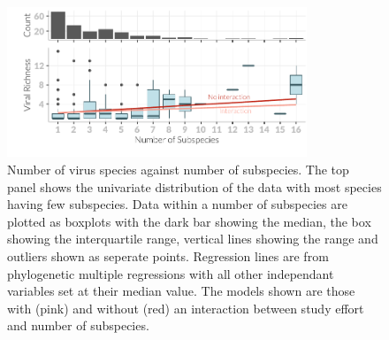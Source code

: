 \begin{knitrout}\footnotesize
{}\color{fgcolor}\begin{figure}[t]

{\centering \includegraphics[width=0.8\textwidth]{figure/boxplot-1} 

}

\caption[Number of virus species against number of subspecies]{Number of virus species against number of subspecies. 		
The top panel shows the univariate distribution of the data with most species having few subspecies.		
Data within a number of subspecies are plotted as boxplots with the dark bar showing the median, the box showing the interquartile range, vertical lines showing the range and outliers shown as seperate points.		
Regression lines are from phylogenetic multiple regressions with all other independant variables set at their median value.		
The models shown are those with (pink) and without (red) an interaction between study effort and number of subspecies.		
}\label{fig:boxplot}
\end{figure}


\end{knitrout}



